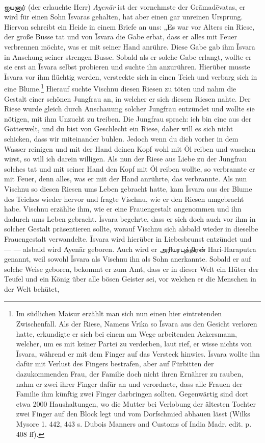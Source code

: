 \documentclass{article}
\newcommand{\TamilText}[1]{\texttamil{#1}}
\newcommand{\tam}[1]{\TamilText{#1}}
\begin{document}
\paragraph{}
\tam{ஐயனார்} (der erlauchte Herr) \emph{Ayen\={a}r} ist der vornehmste der Gr\={a}mad\={e}vatas, er wird für einen Sohn \={I}svaras gehalten, hat aber einen gar unreinen Ursprung. Hiervon schreibt ein Heide in einem Briefe an uns: „Es war vor Alters ein Riese, der große Busse tat und von \={I}svara die Gabe erbat, dass er alles mit Feuer verbrennen möchte, was er mit seiner Hand anrühre. Diese Gabe gab ihm \={I}svara in Ansehung seiner strengen Busse. Sobald als er solche Gabe erlangt, wollte er sie erst an \={I}svara selbst probieren und suchte ihn anzurühren. Hierüber musste \={I}svara vor ihm flüchtig werden, versteckte sich in einen Teich und verbarg sich in eine Blume.\footnote{Im südlichen Maisur erzählt man sich nun einen hier eintretenden Zwischenfall. Als der Riese, Namens Vrika so \={I}svara aus den Gesicht verloren hatte, erkundigte er sich bei einem am Wege arbeitenden Ackersmann, welcher, um es mit keiner Partei zu verderben, laut rief, er wisse nichts von \={I}svara, während er mit dem Finger auf das Versteck hinwies. \={I}svara wollte ihn dafür mit Verlust des Fingers bestrafen, aber auf Fürbitten der dazukommenden Frau, der Familie doch nicht ihren Ernährer zu rauben, nahm er zwei ihrer Finger dafür an und verordnete, dass alle Frauen der Familie ihm künftig zwei Finger darbringen sollten. Gegenwärtig sind dort etwa 2000 Haushaltungen, wo die Mutter bei Verlobung der ältesten Tochter zwei Finger auf den Block legt und vom Dorfschmied abhauen lässt (Wilks Mysore 1. 442, 443 s. Dubois Manners and Customs of India Madr. edit. p. 408 ff).} Hierauf suchte Vischnu diesen Riesen zu töten und nahm die Gestalt einer schönen Jungfrau an, in welcher er sich diesem Riesen nahte. Der Riese wurde gleich durch Anschauung solcher Jungfrau entzündet und wollte sie nötigen, mit ihm Unzucht zu treiben. Die Jungfrau sprach: ich bin eine aus der Götterwelt, und du bist von Geschlecht ein Riese, daher will es sich nicht schicken, dass wir miteinander buhlen. Jedoch wenn du dich vorher in dem Wasser reinigen und mit der Hand deinen Kopf wohl mit Öl reiben und waschen wirst, so will ich darein willigen. Als nun der Riese aus Liebe zu der Jungfrau solches tat und mit seiner Hand den Kopf mit Öl reiben wollte, so verbrannte er mit Feuer, denn alles, was er mit der Hand anrührte, das verbrannte. Als nun Vischnu so diesen Riesen ums Leben gebracht hatte, kam \={I}svara aus der Blume des Teiches wieder hervor und fragte Vischnu, wie er den Riesen umgebracht habe. Vischnu erzählte ihm, wie er eine Frauengestalt angenommen und ihn dadurch ums Leben gebracht. \={I}svara begehrte, dass er sich doch auch vor ihm in solcher Gestalt präsentieren sollte, worauf Vischnu sich alsbald wieder in dieselbe Frauengestalt verwandelte. \={I}svara wird hierüber in Liebesbrunst entzündet und — — alsbald wird Ayen\={a}r geboren. Auch wird er \tam{அரியரபுத்திரன்} Hari-Haraputra genannt, weil sowohl \={I}svara als Vischnu ihn als Sohn anerkannte. Sobald er auf solche Weise geboren, bekommt er zum Amt, dass er in dieser Welt ein Hüter der Teufel und ein König über alle bösen Geister sei, vor welchen er die Menschen in der Welt behütet, 
\end{document}
